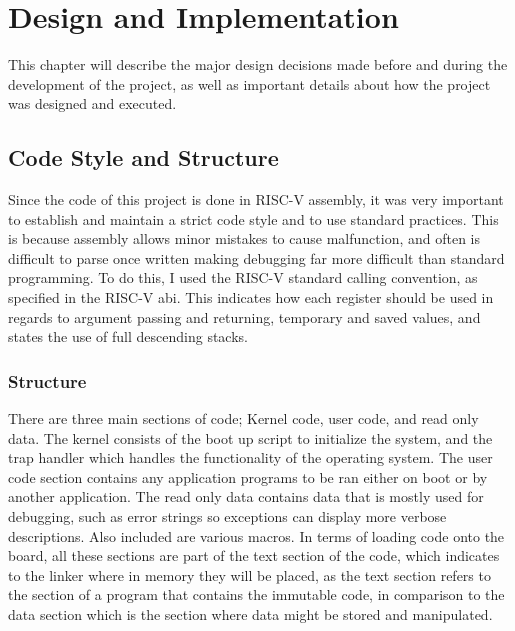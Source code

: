 \chapter{Design and Implementation}
\label{cha:design}
This chapter will describe the major design decisions made before and during the development of the project, as well as important details about how the project was designed and executed.
\section{Code Style and Structure}
Since the code of this project is done in RISC-V assembly, it was very important to establish and maintain a strict code style and to use standard practices. This is because assembly allows minor mistakes to cause malfunction, and often is difficult to parse once written making debugging far more difficult than standard programming. To do this, I used the RISC-V standard calling convention, as specified in the RISC-V \ac{abi}. This indicates how each register should be used in regards to argument passing and returning, temporary and saved values, and states the use of full descending stacks\cite{riscv_abi}.
\subsection{Structure}
There are three main sections of code; Kernel code, user code, and read only data. The kernel consists of the boot up script to initialize the system, and the trap handler which handles the functionality of the operating system. The user code section contains any application programs to be ran either on boot or by another application. The read only data contains data that is mostly used for debugging, such as error strings so exceptions can display more verbose descriptions. Also included are various macros. In terms of loading code onto the board, all these sections are part of the text section of the code, which indicates to the linker where in memory they will be placed, as the text section refers to the section of a program that contains the immutable code, in comparison to the data section which is the section where data might be stored and manipulated.
